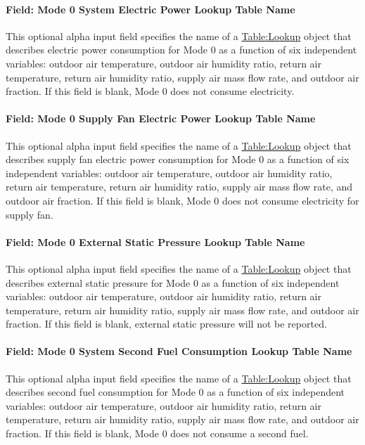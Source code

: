 \paragraph{Field: Mode 0 System Electric Power Lookup Table Name}
This optional alpha input field specifies the name of a \hyperref[tablelookup]{Table:Lookup} object that describes electric power consumption for Mode 0 as a function of six independent variables: outdoor air temperature, outdoor air humidity ratio, return air temperature, return air humidity ratio, supply air mass flow rate, and outdoor air fraction. If this field is blank, Mode 0 does not consume electricity.

\paragraph{Field: Mode 0 Supply Fan Electric Power Lookup Table Name}
This optional alpha input field specifies the name of a \hyperref[tablelookup]{Table:Lookup} object that describes supply fan electric power consumption for Mode 0 as a function of six independent variables: outdoor air temperature, outdoor air humidity ratio, return air temperature, return air humidity ratio, supply air mass flow rate, and outdoor air fraction. If this field is blank, Mode 0 does not consume electricity for supply fan.

\paragraph{Field: Mode 0 External Static Pressure Lookup Table Name}
This optional alpha input field specifies the name of a \hyperref[tablelookup]{Table:Lookup} object that describes external static pressure for Mode 0 as a function of six independent variables: outdoor air temperature, outdoor air humidity ratio, return air temperature, return air humidity ratio, supply air mass flow rate, and outdoor air fraction. If this field is blank, external static pressure will not be reported.

\paragraph{Field: Mode 0 System Second Fuel Consumption Lookup Table Name}
This optional alpha input field specifies the name of a \hyperref[tablelookup]{Table:Lookup} object that describes second fuel consumption for Mode 0 as a function of six independent variables: outdoor air temperature, outdoor air humidity ratio, return air temperature, return air humidity ratio, supply air mass flow rate, and outdoor air fraction. If this field is blank, Mode 0 does not consume a second fuel.

